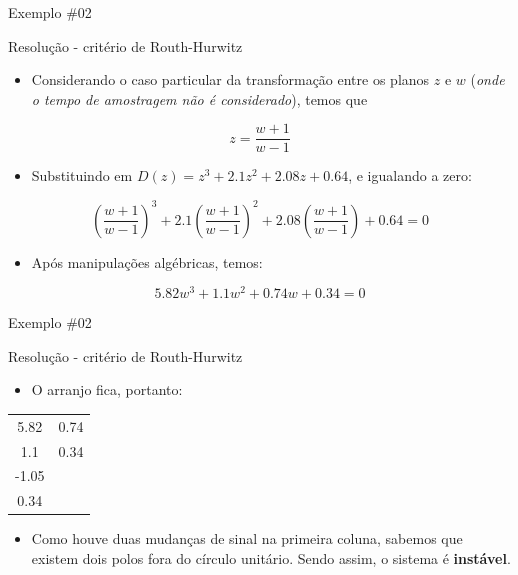 \begin{frame}{Exemplo \#02}
\begin{block}{Resolução - critério de Routh-Hurwitz}
\begin{itemize}
	\item Considerando o caso particular da transformação entre os planos $z$ e $w$ (\textit{onde o tempo de amostragem não é considerado}), temos que
\end{itemize}
$$z = \dfrac{w+1}{w-1}$$
\begin{itemize}
    \item Substituindo em $D(z)=z^{3}+\num{2,1}z^{2}+\num{2,08}z+\num{0,64}$, e igualando a zero:
\end{itemize}
$$\left(\dfrac{w+1}{w-1}\right)^3 + \num{2,1}\left(\dfrac{w+1}{w-1}\right)^2 + \num{2,08}\left(\dfrac{w+1}{w-1}\right) + \num{0,64} = 0$$
\begin{itemize}
    \item Após manipulações algébricas, temos:
\end{itemize}
$$\num{5,82}w^{3}+\num{1,1}w^{2}+\num{0,74}w+\num{0,34} = 0$$
\end{block}
\end{frame}

\begin{frame}{Exemplo \#02}
\begin{block}{Resolução - critério de Routh-Hurwitz}
\begin{itemize}
    \item O arranjo fica, portanto:
\end{itemize}
\begin{longtable}{CC}
	\toprule
		  \num{5,82} & \num{0,74} \\
		  \num{1,1}  & \num{0,34} \\
		 -\num{1,05} &         	  \\
		  \num{0,34} &        	  \\
	\bottomrule 
\end{longtable}
\begin{itemize}
    \item Como houve duas mudanças de sinal na primeira coluna, sabemos que existem dois polos fora do círculo unitário. Sendo assim, o sistema é \textbf{instável}.
\end{itemize}
\end{block}
\end{frame}












